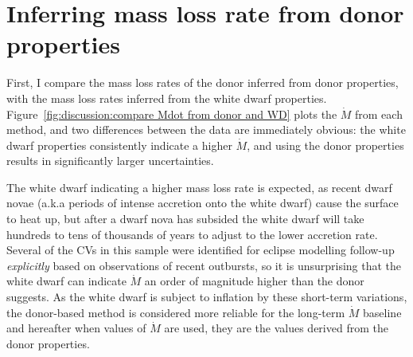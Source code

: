 \section{Inferring mass loss rate from donor properties}
\label{sect:discussion:evolutionary modelling}

First, I compare the mass loss rates of the donor inferred from donor properties, with the mass loss rates inferred from the white dwarf properties. Figure~\ref{fig:discussion:compare Mdot from donor and WD} plots the $\dot M$ from each method, and two differences between the data are immediately obvious: the white dwarf properties consistently indicate a higher $\dot M$, and using the donor properties results in significantly larger uncertainties.

The white dwarf indicating a higher mass loss rate is expected, as recent dwarf novae (a.k.a periods of intense accretion onto the white dwarf) cause the surface to heat up, but after a dwarf nova has subsided the white dwarf will take hundreds to tens of thousands of years to adjust to the lower accretion rate.
Several of the CVs in this sample were identified for eclipse modelling follow-up \textit{explicitly} based on observations of recent outbursts, so it is unsurprising that the white dwarf can indicate $\dot M$ an order of magnitude higher than the donor suggests. As the white dwarf is subject to inflation by these short-term variations, the donor-based method is considered more reliable for the long-term $\dot M$ baseline and hereafter when values of $\dot M$ are used, they are the values derived from the donor properties.

